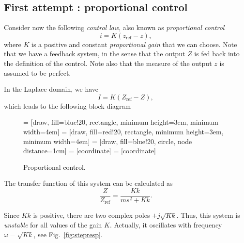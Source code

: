 \documentclass[a4paper,11pt]{report}
\theoremstyle{definition}
\newcommand{\re}{\mathrm{ref}}
\begin{document}
\subsection{First attempt : proportional control}

Consider now the following \emph{control law}, also known as
\emph{proportional control}
\[
i = K(z_\re - z),
\]
where $K$ is a positive and constant \emph{proportional gain} that we
can choose. Note that we have a feedback system, in the sense that the
output $Z$ is fed back into the definition of the control. Note also
that the measure of the output $z$ is assumed to be perfect.

In the Laplace domain, we have
\[
I = K\left(Z_\re - Z\right),
\]
which leads to the following block diagram

\begin{figure}[H]
  \label{fig:examplesystem}
  \centering
   = [draw, fill=blue!20, rectangle, minimum height=3em, minimum width=4em]
   = [draw, fill=red!20, rectangle, minimum height=3em, minimum width=4em]
   = [draw, fill=blue!20, circle, node distance=1cm]
   = [coordinate]
   = [coordinate]
  \caption{Proportional control.}
\end{figure}

The transfer function of this system can be calculated as
\[
\frac{Z}{Z_\re} = \frac{Kk}{ms^2+Kk}.
\]

Since $Kk$ is positive, there are two complex poles $\pm
j\sqrt{Kk}$. Thus, this system is \emph{unstable} for all values of
the gain $K$. Actually, it oscillates with frequency
$\omega=\sqrt{Kk}$, see Fig.~\ref{fig:stepresp}.
\end{document}
